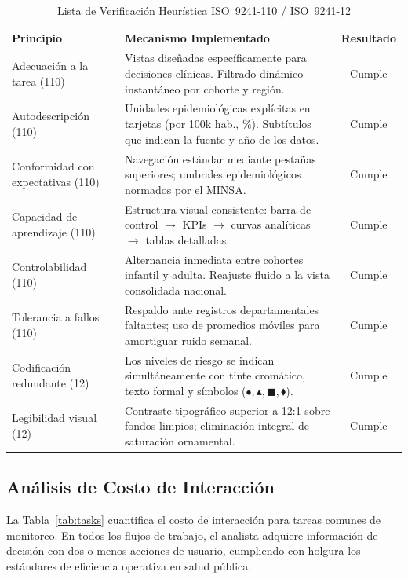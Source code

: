 \documentclass[conference]{IEEEtran}
\begin{document}
\begin{table}[!t]
\caption{Lista de Verificaci\'on Heur\'istica ISO~9241-110 / ISO~9241-12}
\label{tab:heuristic}
\centering
\footnotesize
\begin{tabularx}{\columnwidth}{@{}p{2.1cm}Xc@{}}
\toprule
\textbf{Principio} & \textbf{Mecanismo Implementado} & \textbf{Resultado} \\
\midrule
Adecuaci\'on a la tarea (110) &
Vistas dise\~nadas espec\'ificamente para decisiones cl\'inicas. Filtrado din\'amico instant\'aneo por cohorte y regi\'on. & Cumple \\
\addlinespace
Autodescripci\'on (110) &
Unidades epidemiol\'ogicas expl\'icitas en tarjetas (por 100k hab., \%). Subt\'itulos que indican la fuente y a\~no de los datos. & Cumple \\
\addlinespace
Conformidad con expectativas (110) &
Navegaci\'on est\'andar mediante pesta\~nas superiores; umbrales epidemiol\'ogicos normados por el MINSA. & Cumple \\
\addlinespace
Capacidad de aprendizaje (110) &
Estructura visual consistente: barra de control $\to$ KPIs $\to$ curvas anal\'iticas $\to$ tablas detalladas. & Cumple \\
\addlinespace
Controlabilidad (110) &
Alternancia inmediata entre cohortes infantil y adulta. Reajuste fluido a la vista consolidada nacional. & Cumple \\
\addlinespace
Tolerancia a fallos (110) &
Respaldo ante registros departamentales faltantes; uso de promedios m\'oviles para amortiguar ruido semanal. & Cumple \\
\addlinespace
Codificaci\'on redundante (12) &
Los niveles de riesgo se indican simult\'aneamente con tinte crom\'atico, texto formal y s\'imbolos ($\bullet, \blacktriangle, \blacksquare, \blacklozenge$). & Cumple \\
\addlinespace
Legibilidad visual (12) &
Contraste tipogr\'afico superior a 12:1 sobre fondos limpios; eliminaci\'on integral de saturaci\'on ornamental. & Cumple \\
\bottomrule
\end{tabularx}
\end{table}

\subsection{An\'alisis de Costo de Interacci\'on}

La Tabla~\ref{tab:tasks} cuantifica el costo de interacci\'on para tareas comunes de monitoreo. En todos los flujos de trabajo, el analista adquiere informaci\'on de decisi\'on con dos o menos acciones de usuario, cumpliendo con holgura los est\'andares de eficiencia operativa en salud p\'ublica.
\end{document}
